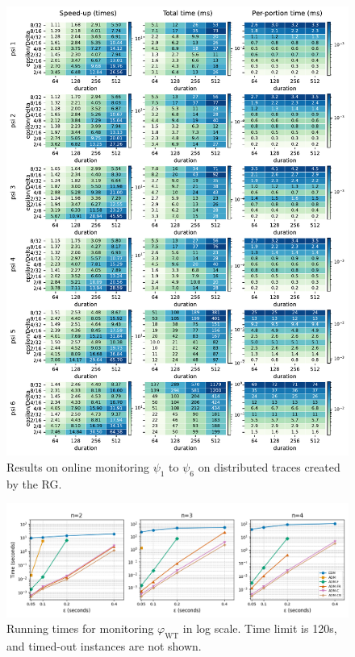\documentclass[iicol,lineno]{sn-jnl}
\newcommand{\?}{\text{?}}
\begin{document}
	\begin{figure}[p]
		\begin{center}
			\includegraphics[width=\linewidth]{speedupOnline_all.pdf}
			\caption{Results on online monitoring $\psi_1$ to $\psi_6$ on distributed traces created by the RG.}	\label{fig:rgresultsOnline}
		\end{center}
	\end{figure}
	\clearpage
	\begin{figure}[t]
		\begin{center}
			\includegraphics[width=\linewidth]{wt_newnames.png}
			\caption{Running times for monitoring $\varphi_{\text{WT}}$ in log scale. Time limit is 120s, and timed-out instances are not shown.}
		\end{center}
	\end{figure}
\end{document}
